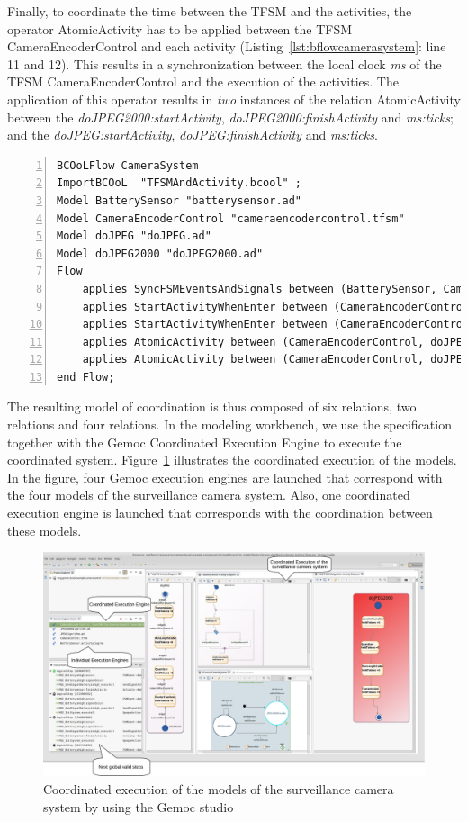 Finally, to coordinate the time between the TFSM and the activities, the operator AtomicActivity has to be applied between the TFSM CameraEncoderControl and each activity (Listing~\ref{lst:bflowcamerasystem}: line 11 and 12). This results in a synchronization between the local clock \emph{ms} of the TFSM CameraEncoderControl and the execution of the activities. The application of this operator results in \emph{two} instances of the \moccml relation AtomicActivity between the \mse \emph{doJPEG2000:startActivity}, \emph{doJPEG2000:finishActivity} and \emph{ms:ticks}; and the \mse \emph{doJPEG:startActivity}, \emph{doJPEG:finishActivity} and \emph{ms:ticks}.


\begin{lstlisting}[language=bflow,
caption={\bflow specification for the Surveillance Camera System},
label={lst:bflowcamerasystem}, 
basicstyle=\scriptsize\ttfamily, backgroundcolor=\color{LGrey}, numbers=left, xleftmargin=2pt]
BCOoLFlow CameraSystem
ImportBCOoL  "TFSMAndActivity.bcool" ;
Model BatterySensor "batterysensor.ad"
Model CameraEncoderControl "cameraencodercontrol.tfsm"
Model doJPEG "doJPEG.ad"
Model doJPEG2000 "doJPEG2000.ad"
Flow 
	applies SyncFSMEventsAndSignals between (BatterySensor, CameraEncoderControl);
	applies StartActivityWhenEnter between (CameraEncoderControl, doJPEG);
	applies StartActivityWhenEnter between (CameraEncoderControl, doJPEG2000);
	applies AtomicActivity between (CameraEncoderControl, doJPEG);		
	applies AtomicActivity between (CameraEncoderControl, doJPEG2000);		
end Flow;
\end{lstlisting}

The resulting model of coordination is thus composed of six relations, \ie two \ccsl relations and four \moccml relations. In the modeling workbench, we use the \bflow specification together with the Gemoc Coordinated Execution Engine to execute the coordinated system. Figure~\ref{fig:studiocamera} illustrates the coordinated execution of the models. In the figure, four Gemoc execution engines are launched that correspond with the four models of the surveillance camera system. Also, one coordinated execution engine is launched that corresponds with the coordination between these models. 

		\begin{figure}[h]
			\center
			\includegraphics[width=.9\columnwidth]{examples/figs/screenshot}
			\caption{Coordinated execution of the models of the surveillance camera system by using the Gemoc studio}
			\label{fig:studiocamera}
		\end{figure}


